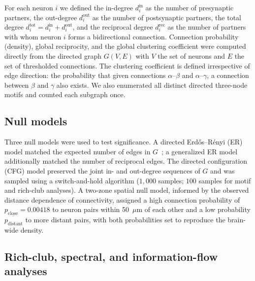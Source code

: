 \documentclass[11pt]{article}
\begin{document}
For each neuron $i$ we defined the in-degree $d^{\text{in}}_i$ as the
number of presynaptic partners, the out-degree $d^{\text{out}}_i$ as the
number of postsynaptic partners, the total degree
$d^{\text{tot}}_i = d^{\text{in}}_i + d^{\text{out}}_i$, and the reciprocal
degree $d^{\text{rec}}_i$ as the number of partners with whom neuron $i$
forms a bidirectional connection. Connection probability (density), global
reciprocity, and the global clustering coefficient were computed directly
from the directed graph $G(V,E)$ with $V$ the set of neurons and $E$ the
set of thresholded connections. The clustering coefficient is defined
irrespective of edge direction: the probability that given connections
$\alpha$--$\beta$ and $\alpha$--$\gamma$, a connection between $\beta$ and
$\gamma$ also exists. We also enumerated all distinct directed three-node
motifs and counted each subgraph once.

\subsection{Null models}

Three null models were used to test significance. A directed
Erd{\H o}s--R{\'e}nyi (ER) model matched the expected number of edges in
$G$~\cite{erdos1960evolution}; a generalized ER model additionally matched
the number of reciprocal edges. The directed configuration (CFG) model
preserved the joint in- and out-degree sequences of $G$ and was sampled
using a switch-and-hold algorithm ($1{,}000$ samples; $100$ samples for
motif and rich-club analyses). A two-zone spatial null model, informed by
the observed distance dependence of connectivity, assigned a high
connection probability of $p_{\text{close}} = 0.00418$ to neuron pairs
within 50~$\mu$m of each other and a low probability
$p_{\text{distant}}$ to more distant pairs, with both probabilities set to
reproduce the brain-wide density.

\subsection{Rich-club, spectral, and information-flow analyses}
\end{document}
